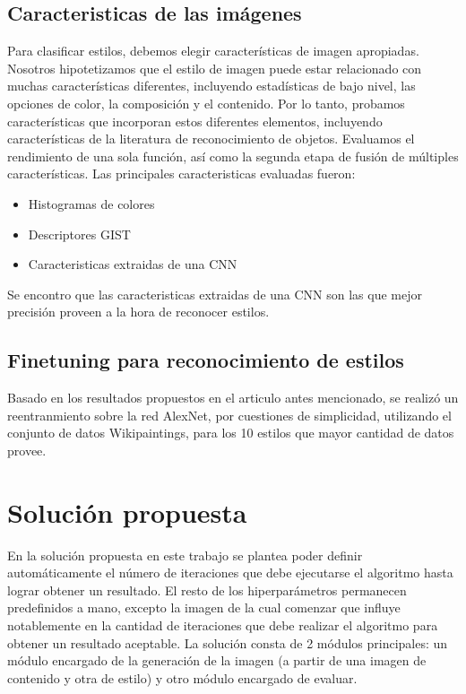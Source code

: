 \documentclass[a4paper,11pt,spanish]{book}
\begin{document}
    \subsection{Caracteristicas de las imágenes}
	Para clasificar estilos, debemos elegir características de imagen apropiadas. Nosotros hipotetizamos que el estilo de imagen puede estar relacionado con muchas características diferentes, 
	incluyendo estadísticas de bajo nivel, las opciones de color, la composición y el contenido. Por lo tanto, probamos características que incorporan estos diferentes elementos, incluyendo características de la 
	literatura de reconocimiento de objetos. Evaluamos el rendimiento de una sola función, así como la segunda etapa de fusión de múltiples características.
	Las principales caracteristicas evaluadas fueron:
	\begin{itemize}
	 \item Histogramas de colores
	 \item Descriptores GIST
	 \item Caracteristicas extraidas de una CNN
	\end{itemize}
	Se encontro que las caracteristicas extraidas de una CNN son las que mejor precisión proveen a la hora de reconocer estilos.

    \subsection{Finetuning para reconocimiento de estilos}
      Basado en los resultados propuestos en el articulo antes mencionado, se realizó un reentranmiento sobre la red AlexNet, por cuestiones de simplicidad, utilizando
      el conjunto de datos Wikipaintings, para los 10 estilos que mayor cantidad de datos provee.
  
  \section{Solución propuesta}
    En la solución propuesta en este trabajo se plantea poder definir automáticamente el número de iteraciones que debe ejecutarse el algoritmo hasta lograr obtener un resultado.
    El resto de los hiperparámetros permanecen predefinidos a mano, excepto la imagen de la cual comenzar que influye notablemente en la cantidad de iteraciones que debe realizar el 
    algoritmo para obtener un resultado aceptable.
    La solución consta de 2 módulos principales: un módulo encargado de la generación de la imagen (a partir de una imagen de contenido y otra de estilo) y otro módulo encargado de 
    evaluar.
\end{document}
